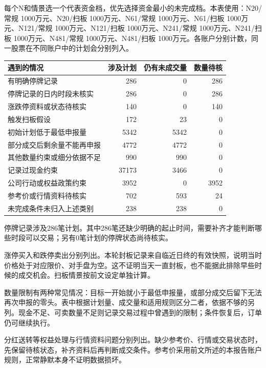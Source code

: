 \documentclass[UTF8,10pt,a4paper,fontset=fandol]{ctexart}
\begin{document}
每个N和情景选一个代表资金档，优先选择资金最小的未完成档。本表使用：N20/常规 1000万元、N20/扫板 1000万元、N61/常规 1000万元、N61/扫板 1000万元、N121/常规 1000万元、N121/扫板 1000万元、N241/常规 1000万元、N241/扫板 1000万元、N481/常规 1000万元、N481/扫板 1000万元。各账户分别计数，同一股票在不同账户中的计划会分别列入。\begin{table}[H]\centering\small\begin{tabular}{lrrr}\toprule 遇到的情况 & 涉及计划 & 仍有未成交量 & 数量待核\\\midrule 有明确停牌记录 & 286 & 0 & 286 \\
停牌记录的日内时段未核实 & 286 & 0 & 286 \\
涨跌停资料或状态待核实 & 140 & 0 & 140 \\
触发扫板假设 & 172 & 23 & 0 \\
初始计划低于最低申报量 & 5342 & 5342 & 0 \\
部分成交后剩余量不能再申报 & 4772 & 4772 & 0 \\
其他数量约束或细分依据不足 & 990 & 990 & 0 \\
记录过现金约束 & 37173 & 3466 & 0 \\
公司行动或权益政策约束 & 3952 & 0 & 3952 \\
参考价或行情资料待核实 & 702 & 593 & 24 \\
未完成条件未归入上述类别 & 238 & 238 & 0 \\\bottomrule\end{tabular}\end{table}

停牌记录涉及286笔计划。其中286笔还缺少明确的起止时间，需要补齐才能判断哪些时段可以交易；另有0笔计划的停牌状态尚待核实。

涨停买入和跌停卖出分别列出。本轮封板记录来自临近日终的有效快照，说明当时价格处于对应限价、对手盘为空。这不证明当天一直封板，也不能据此排除早些时候的成交机会。扫板情景按前文设定单独计算。

数量限制有两种常见情况：目标一开始就小于最低申报量，或部分成交后留下无法再次申报的零头。表中根据计划量、成交量和适用规则区分二者，依据不够的另列。现金不足、可卖数量不足则记录交易过程中曾遇到的限制；条件恢复后，订单仍可继续执行。

分红送转等权益处理与行情资料问题分别列出。缺少参考价、行情或交易状态时，先保留待核状态，补齐资料后再判断成交条件。参考价采用前文所述的本报告账户规则，正常静默本身不证明数据损坏。
\end{document}
